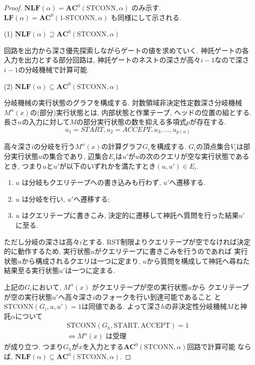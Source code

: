 \documentclass[10pt,a4paper,twocolumn]{jarticle}
\theoremstyle{definition}
\theoremstyle{remark}
\newcommand{\classfont}{\mathbf}
\newcommand{\AC}{\classfont{AC}}
\newcommand{\cfL}{\classfont{LF}}
\newcommand{\cfNL}{\classfont{NLF}}
\newcommand{\probfont}{\text}
\newcommand{\oneSTCONN}{\probfont{1-STCONN}}
\newcommand{\STCONN}{\probfont{STCONN}}
\begin{document}
\begin{proof}
  $\cfNL(\alpha) = \AC^0(\STCONN, \alpha)$ のみ示す.
 $\cfL(\alpha) = \AC^0(\oneSTCONN, \alpha)$ も同様にして示される.

 (1) $\cfNL(\alpha) \supseteq \AC^0(\STCONN, \alpha)$
 
 回路を出力から深さ優先探索しながらゲートの値を求めていく.
 神託ゲートの各入力を出力とする部分回路は,
 神託ゲートのネストの深さが高々$i-1$なので深さ$i-1$の分岐機械で計算可能.

 (2) $\cfNL(\alpha) \subseteq \AC^0(\STCONN, \alpha)$

 分岐機械の実行状態のグラフを構成する.
 対数領域非決定性定数深さ分岐機械$M^\alpha(x)$の(部分)実行状態とは,
 内部状態と作業テープ, ヘッドの位置の組とする.
 長さ$n$の入力に対して$M$の部分実行状態の数を抑える多項式$p$が存在する.
 \[
 u_1=\mathit{START}, u_2=\mathit{ACCEPT}, u_3, \dots, u_{p(n)}
 \]

 高々深さ$i$の分岐を行う$M^\alpha(x)$の計算グラフ$G_i$を構成する.
 $G_i$の頂点集合$V_i$は部分実行状態$u$の集合であり,
 辺集合$E_i$は$u'$が$u$の次のクエリが空な実行状態であるとき,
 つまり$u$と$u'$が以下のいずれかを満たすとき$(u, u') \in E_i$.
 \begin{enumerate}
 \item $u$ は分岐もクエリテープへの書き込みも行わず,
       $u'$へ遷移する.
 \item $u$ は分岐を行い, $u'$へ遷移する;
 \item $u$ はクエリテープに書きこみ,
       決定的に遷移して神託へ質問を行った結果$u'$に至る.
 \end{enumerate}
 ただし分岐の深さは高々$i$とする.
 RST制限よりクエリテープが空でなければ決定的に動作するため,
 実行状態$u$がクエリテープに書きこみを行うのであれば
 実行状態$u$から構成されるクエリは一つに定まり,
 $u$から質問を構成して神託へ尋ねた結果至る実行状態$u'$は一つに定まる.

 上記の$G_i$において, $M^\alpha(x)$ がクエリテープが空の実行状態$u$から
 クエリテープが空の実行状態$u'$へ高々深さ$i$のフォークを行い到達可能であること
 と$\STCONN(G_i, u, u') = 1$は同値である. 
 よって深さ$h$の非決定性分岐機械$M$と神託$\alpha$について
 \begin{multline*}
 \STCONN(G_h, \mathrm{START}, \mathrm{ACCEPT}) = 1 \\
 \iff M^\alpha(x) \text{ は受理}
 \end{multline*}
 が成り立つ.
 つまり$G_h$が$x$を入力とする$\AC^0(\STCONN, \alpha)$回路で計算可能
 ならば, $\cfNL(\alpha) \subseteq \AC^0(\STCONN, \alpha)$.


\end{proof}
\end{document}
